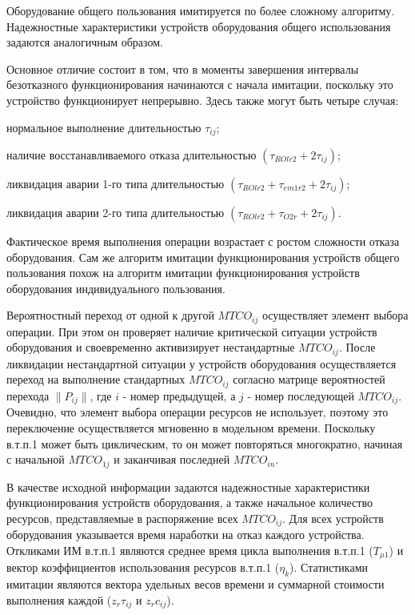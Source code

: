 Оборудование общего пользования имитируется по более сложному алгоритму. Надежностные характеристики устройств оборудования общего использования задаются аналогичным образом.

Основное отличие состоит в том, что в моменты завершения интервалы безотказного функционирования начинаются с начала имитации, поскольку это устройство функционирует непрерывно. Здесь также могут быть четыре случая:
\begin{textitemize}
    \item нормальное выполнение длительностью $\tau_{ij}$;
    \item наличие восстанавливаемого отказа длительностью  $(\tau_{ROlr2} + 2 \tau_{ij})$;
    \item ликвидация аварии 1-го типа длительностью  $(\tau_{ROlr2} + \tau_{em1r2} + 2 \tau_{ij})$;
    \item ликвидация аварии 2-го типа длительностью $(\tau_{ROlr2} + \tau_{O2r} + 2 \tau_{ij})$.
\end{textitemize}


Фактическое время выполнения операции возрастает с ростом сложности отказа оборудования. Сам же алгоритм имитации функционирования устройств общего пользования похож на алгоритм имитации функционирования устройств оборудования индивидуального пользования.




Вероятностный переход от одной к другой $MTCO_{ij}$ осуществляет элемент выбора операции. При этом он проверяет наличие критической ситуации устройств оборудования и своевременно активизирует нестандартные $MTCO_{ij}$.  После ликвидации нестандартной ситуации у устройств оборудования осуществляется переход на выполнение стандартных $MTCO_{ij}$ согласно матрице вероятностей перехода $\parallel P_{ij} \parallel $, где $i$ - номер предыдущей, а $j$ - номер последующей $MTCO_{ij}$.  Очевидно, что элемент выбора операции ресурсов не использует, поэтому это переключение осуществляется мгновенно в модельном времени.  Поскольку в.т.п.1 может быть циклическим, то он может повторяться многократно, начиная с начальной $MTCO_{1j}$ и заканчивая последней $MTCO_{in}$.

В качестве исходной информации задаются надежностные характеристики функционирования устройств оборудования, а также начальное количество ресурсов, представляемые в распоряжение всех $MTCO_{ij}$. Для всех устройств оборудования указывается время наработки на отказ каждого устройства. Откликами ИМ в.т.п.1 являются среднее время цикла выполнения в.т.п.1 ($T_{\mu 1}$) и вектор коэффициентов использования ресурсов в.т.п.1 ($\eta_{k}$). Статистиками имитации являются вектора удельных весов времени и суммарной стоимости выполнения каждой   ({$z_r \tau_{ij}$} и {$z_rc_{ij}$}).



